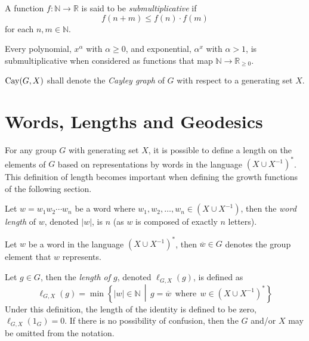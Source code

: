 \begin{definition}
	A function $f : \mathbb{N} \to \mathbb{R}$ is said to be \emph{submultiplicative} if \[ f(n + m) \leq f(n) \cdot f(m) \] for each $n,m \in \mathbb{N}$.
\end{definition}

\begin{example}
	Every polynomial, $x^\alpha$ with $\alpha \geq 0$, and exponential, $\alpha^x$ with $\alpha > 1$, is submultiplicative when considered as functions that map $\mathbb{N} \to \mathbb{R}_{\geq 0}$.
\end{example}

\begin{definition}
	$\operatorname{Cay}(G,X)$ shall denote the \emph{Cayley graph} of $G$ with respect to a generating set $X$.
\end{definition}

\newpage
\section{Words, Lengths and Geodesics}

For any group $G$ with generating set $X$, it is possible to define a length on the elements of $G$ based on representations by words in the language $\left( X \cup X^{-1} \right)^\ast$.
This definition of length becomes important when defining the growth functions of the following section.

\begin{definition}
	\label{def:word-length}
	Let $w = w_1 w_2 \cdots w_n$ be a word where $w_1, w_2, \ldots,w_n \in \left( X \cup X^{-1} \right)$, then the \emph{word length} of $w$, denoted $\left\vert w \right\vert$, is $n$ (as $w$ is composed of exactly $n$ letters).
\end{definition}

\begin{definition}
	Let $w$ be a word in the language $\left( X \cup X^{-1} \right)^\ast$, then $\overline{w} \in G$ denotes the group element that $w$ represents.
\end{definition}

\begin{definition}
	\label{def:length}
	Let $g \in G$, then the \emph{length of $g$}, denoted $\ell_{G,X}(g)$, is defined as
	\[
	  \ell_{G,X}(g)
	  =
	  \min
	  \left\lbrace
	    \left\vert w \right\vert \in \mathbb{N}
	    \, \middle\vert \,
	    g = \overline{w}
	    \ \ 
	    \text{where}
	    \ \ 
	    w \in \left(X \cup X^{-1}\right)^\ast
	  \right\rbrace
	\]
	Under this definition, the length of the identity is defined to be zero, $ \ell_{G,X}(1_G) = 0$.
	If there is no possibility of confusion, then the $G$ and/or $X$ may be omitted from the notation.
\end{definition}

